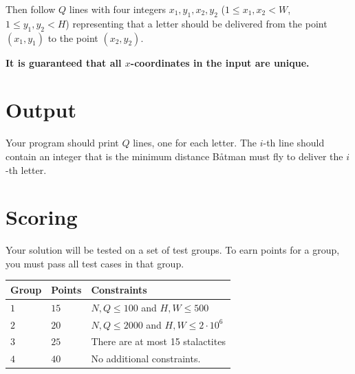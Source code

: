 Then follow $Q$ lines with four integers
$x_{1},y_{1},x_{2},y_{2}$ ($1\le x_{1},x_{2} < W$, $1\le y_{1},y_{2}< H$) representing that a letter should be delivered from
the point $(x_{1},y_{1})$ to the point $(x_{2},y_{2})$.

\textbf{It is guaranteed that all $x$-coordinates in the input are unique.}

\section*{Output}
Your program should print $Q$ lines, one for each letter.
The $i$-th line should contain an integer that is the minimum
distance Båtman must fly to deliver the $i$-th letter.

\section*{Scoring}
Your solution will be tested on a set of test groups.
To earn points for a group, you must pass all test cases in that group.

\noindent
\begin{tabular}{| l | l | l |}
\hline
\textbf{Group} & \textbf{Points} & \textbf{Constraints} \\ \hline
$1$    & $15$         & $N,Q\le 100$ and $H,W\le 500$ \\ \hline
$2$    & $20$         & $N,Q \le 2000$ and $H,W\le 2\cdot 10^6$\\ \hline
$3$    & $25$         & There are at most 15 stalactites \\ \hline
$4$    & $40$         & No additional constraints. \\ \hline
\end{tabular}

